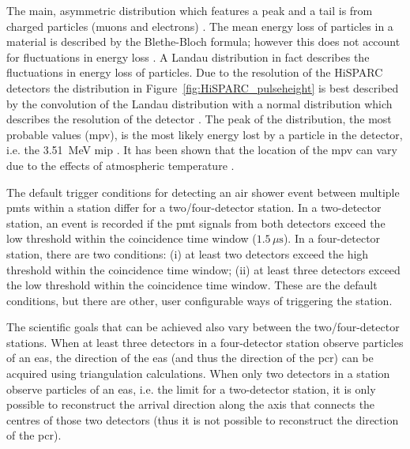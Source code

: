The main, asymmetric distribution which features a peak and a tail is from charged particles (muons and electrons) \citep{van_dam_hisparc_2020}. The mean energy loss of particles in a material is described by the Blethe-Bloch formula; however this does not account for fluctuations in energy loss \citep{fokkema_hisparc_2012}. A Landau distribution in fact describes the fluctuations in energy loss of particles. Due to the resolution of the HiSPARC detectors the distribution in Figure~\ref{fig:HiSPARC_pulseheight} is best described by the convolution of the Landau distribution with a normal distribution which describes the resolution of the detector \citep{fokkema_hisparc_2012}. The peak of the distribution, the most probable values (\gls{mpv}), is the most likely energy lost by a particle in the detector, i.e. the 3.51~MeV \gls{mip} \citep{van_dam_hisparc_2020}. It has been shown that the location of the \gls{mpv} can vary due to the effects of atmospheric temperature \citep{bartels_hisparc_2012, van_dam_hisparc_2020}.

The default trigger conditions for detecting an air shower event between multiple \glspl{pmt} within a station differ for a two/four-detector station. In a two-detector station, an event is recorded if the \gls{pmt} signals from both detectors exceed the low threshold within the coincidence time window ($1.5 \, \mu\mathrm{s}$). In a four-detector station, there are two conditions: (i) at least two detectors exceed the high threshold within the coincidence time window; (ii) at least three detectors exceed the low threshold within the coincidence time window. These are the default conditions, but there are other, user configurable ways of triggering the station.

The scientific goals that can be achieved also vary between the two/four-detector stations. When at least three detectors in a four-detector station observe particles of an \gls{eas}, the direction of the \gls{eas} (and thus the direction of the \gls{pcr}) can be acquired using triangulation calculations. When only two detectors in a station observe particles of an \gls{eas}, i.e. the limit for a two-detector station, it is only possible to reconstruct the arrival direction along the axis that connects the centres of those two detectors (thus it is not possible to reconstruct the direction of the \gls{pcr}).




